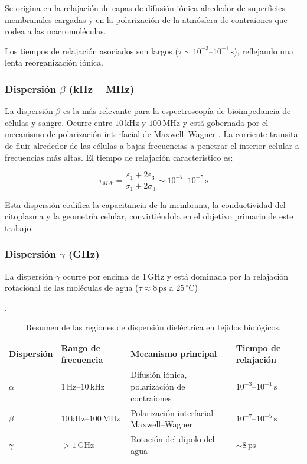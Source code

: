 \documentclass[12pt]{article}
\begin{document}
Se origina en la relajaci\'on de capas de difusi\'on i\'onica alrededor de superficies membranales
cargadas y en la polarizaci\'on de la atm\'osfera de contraiones que rodea a las macromol\'eculas.

Los tiempos de relajaci\'on asociados son largos ($\tau \sim 10^{-3}$--$10^{-1}\,\text{s}$),
reflejando una lenta reorganizaci\'on i\'onica.

\subsubsection{Dispersi\'on \texorpdfstring{$\beta$}{Beta} (kHz -- MHz)} La dispersi\'on $\beta$
es la m\'as relevante para la espectroscop\'ia de bioimpedancia de c\'elulas y sangre. Ocurre entre
$10\,\text{kHz}$ y $100\,\text{MHz}$ y est\'a gobernada por el
mecanismo
de polarizaci\'on interfacial de Maxwell--Wagner \citep{Maxwell1873, Wagner1914}. La corriente
transita de fluir alrededor de las c\'elulas a bajas frecuencias a penetrar el interior celular
a frecuencias m\'as altas. El tiempo de relajaci\'on caracter\'istico es:

\begin{equation}
\tau_{MW} = \frac{\varepsilon_1 + 2\varepsilon_3}{\sigma_1 + 2\sigma_3}
\sim 10^{-7}\text{--}10^{-5}\,\text{s}
\end{equation}

Esta dispersi\'on codifica la capacitancia de la membrana, la conductividad del citoplasma y
la geometr\'ia celular, convirti\'endola en el objetivo primario de este trabajo.

\subsubsection{Dispersi\'on \texorpdfstring{$\gamma$}{Gamma} (GHz)} La dispersi\'on
$\gamma$ ocurre por encima de $1\,\text{GHz}$ y est\'a dominada por la relajaci\'on rotacional
de las mol\'eculas de agua ($\tau \approx 8\,\text{ps}$ a
$25\,^\circ\text{C}$)

\citep{Kaatze1989}.

\begin{table}[H]
\centering
\caption{Resumen de las regiones de dispersi\'on diel\'ectrica en tejidos biol\'ogicos.}
\label{tab:dispersiones}
\begin{tabular}{@{}llll@{}}
\toprule
\textbf{Dispersi\'on} & \textbf{Rango de frecuencia}
& \textbf{Mecanismo principal} & \textbf{Tiempo de relajaci\'on} \\
\midrule
$\alpha$ & $1\,\text{Hz}$--$10\,\text{kHz}$
& Difusi\'on i\'onica, polarizaci\'on de contraiones
& $10^{-3}$--$10^{-1}\,\text{s}$ \\
$\beta$ & $10\,\text{kHz}$--$100\,\text{MHz}$
& Polarizaci\'on interfacial Maxwell--Wagner
& $10^{-7}$--$10^{-5}\,\text{s}$ \\
$\gamma$ & $>1\,\text{GHz}$
& Rotaci\'on del dipolo del agua
& $\sim 8\,\text{ps}$ \\
\bottomrule
\end{tabular}
\end{table}
\end{document}
